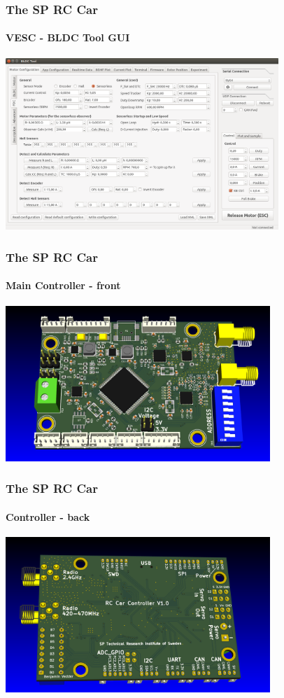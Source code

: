 \documentclass[aspectratio=169,electronics,notopline]{beamer}
\begin{document}
\begin{frame}
\frametitle{The SP RC Car}
\framesubtitle{VESC - BLDC Tool GUI}
\begin{center}
\includegraphics[height=65mm]{Figures/BLDC_Tool_FOC.png}
\end{center}
\end{frame}

\begin{frame} 
\frametitle{The SP RC Car}
\framesubtitle{Main Controller - front}
\begin{center}
	\includegraphics[width=10cm]{Figures/controller_front.png}
\end{center}
\end{frame}

\begin{frame} 
\frametitle{The SP RC Car}
\framesubtitle{Controller - back}
\begin{center}
	\includegraphics[width=10cm]{Figures/controller_back.png}
\end{center}
\end{frame}
\end{document}
